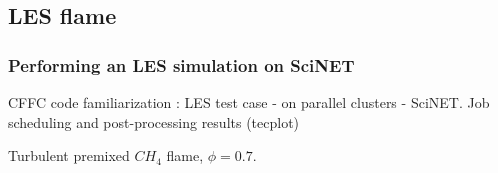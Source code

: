 \documentclass{beamer}
\begin{document}

\subsection{LES flame}
\begin{frame}
\frametitle{Performing an LES simulation on SciNET}
\scriptsize
CFFC code familiarization : LES test case - on parallel clusters - SciNET. Job scheduling and post-processing results (tecplot)
\begin{minipage}[t][1\textheight]{1\textwidth}
\vspace{-10pt}
\begin{exampleblock}{Turbulent premixed $CH_4$ flame, $\phi=0.7$. }
\vspace{-20pt}
\begin{figure}
\label{fig:LES}
\centering
{}

\end{figure}
\end{exampleblock}
\end{minipage}
\end{frame}
\end{document}
